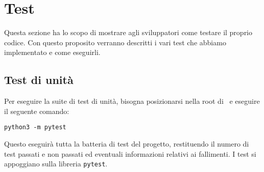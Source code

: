 \section{Test}\label{Test}

Questa sezione ha lo scopo di mostrare agli sviluppatori come testare il proprio codice. Con questo proposito verranno descritti i vari test che abbiamo
implementato e come eseguirli.

\subsection{Test di unità}

Per eseguire la suite di test di unità, bisogna posizionarsi nella root di \progetto\ e eseguire il seguente comando:

\begin{center}
    \texttt{python3 -m pytest}
\end{center}

Questo eseguirà tutta la batteria di test del progetto, restituendo il numero di test passati e non passati ed eventuali informazioni relativi ai fallimenti.
I test si appoggiano sulla libreria \texttt{pytest}.
